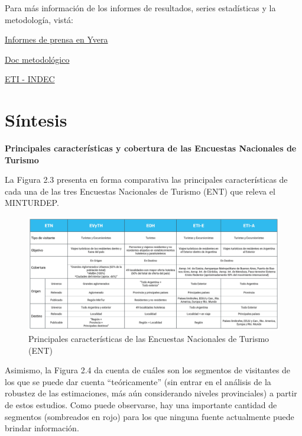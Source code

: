 \documentclass[
  openany]{book}
\begin{document}
Para más información de los informes de resultados, series estadísticas y la metodología, vistá:

\href{https://www.yvera.tur.ar/estadistica/informe/info/turismo-internacional}{Informes de prensa en Yvera}

\href{https://www.yvera.tur.ar/estadistica/informe/documentos/descarga/5d5c00efe6866641938689.pdf}{Doc metodológico}

\href{https://www.indec.gob.ar/indec/web/Nivel4-Tema-3-13-55}{ETI - INDEC}

\hypertarget{suxedntesis}{%
\section{Síntesis}\label{suxedntesis}}

\textbf{Principales características y cobertura de las Encuestas Nacionales de Turismo}

La Figura 2.3 presenta en forma comparativa las principales características de cada una de las tres Encuestas Nacionales de Turismo (ENT) que releva el MINTURDEP.

\begin{figure}

{\centering \includegraphics[width=1\linewidth]{imagenes/figura2.3} 

}

\caption{Principales características de las Encuestas Nacionales de Turismo (ENT)}\label{fig:ent}
\end{figure}

Asimismo, la Figura 2.4 da cuenta de cuáles son los segmentos de visitantes de los que se puede dar cuenta ``teóricamente'' (sin entrar en el análisis de la robustez de las estimaciones, más aún considerando niveles provinciales) a partir de estos estudios.
Como puede observarse, hay una importante cantidad de segmentos (sombreados en rojo) para los que ninguna fuente actualmente puede brindar información.
\end{document}
